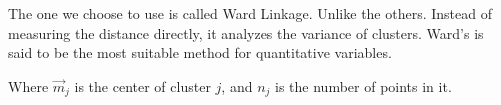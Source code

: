 \documentclass[a4paper, 12pt]{article}
\begin{document}
The one we choose to use is called Ward Linkage. Unlike the others. Instead of measuring the distance directly, it analyzes the variance of clusters. Ward’s is said to be the most suitable method for quantitative variables.

Where $\vec{m}_j$ is the center of cluster $j$, and $n_j$ is the number of points in it.

\end{document}
